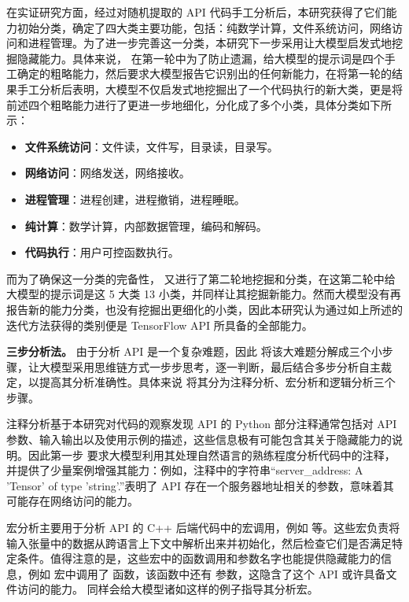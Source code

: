 在实证研究方面，经过对随机提取的 API 代码手工分析后，本研究获得了它们能力初始分类，确定了四大类主要功能，包括：纯数学计算，文件系统访问，网络访问和进程管理。为了进一步完善这一分类，本研究下一步采用让大模型启发式地挖掘隐藏能力。具体来说， 在第一轮中为了防止遗漏，给大模型的提示词是四个手工确定的粗略能力，然后要求大模型报告它识别出的任何新能力，在将第一轮的结果手工分析后表明，大模型不仅启发式地挖掘出了一个代码执行的新大类，更是将前述四个粗略能力进行了更进一步地细化，分化成了多个小类，具体分类如下所示：
\begin{itemize}
    \item \textbf{文件系统访问}：文件读，文件写，目录读，目录写。
    \item \textbf{网络访问}：网络发送，网络接收。
    \item \textbf{进程管理}：进程创建，进程撤销，进程睡眠。
    \item \textbf{纯计算}：数学计算，内部数据管理，编码和解码。
    \item \textbf{代码执行}：用户可控函数执行。
\end{itemize}

而为了确保这一分类的完备性， 又进行了第二轮地挖掘和分类，在这第二轮中给大模型的提示词是这 5 大类 13 小类，并同样让其挖掘新能力。然而大模型没有再报告新的能力分类，也没有挖掘出更细化的小类，因此本研究认为通过如上所述的迭代方法获得的类别便是 TensorFlow API 所具备的全部能力。

\textbf{三步分析法。}
由于分析 API 是一个复杂难题，因此  将该大难题分解成三个小步骤，让大模型采用思维链方式一步步思考，逐一判断，最后结合多步分析自主裁定，以提高其分析准确性。具体来说  将其分为注释分析、宏分析和逻辑分析三个步骤。

注释分析基于本研究对代码的观察发现 API 的 Python 部分注释通常包括对 API 参数、输入输出以及使用示例的描述，这些信息极有可能包含其关于隐藏能力的说明。因此第一步  要求大模型利用其处理自然语言的熟练程度分析代码中的注释，并提供了少量案例增强其能力：例如，注释中的字符串“server\_address: A 'Tensor' of type 'string'.”表明了 API 存在一个服务器地址相关的参数，意味着其可能存在网络访问的能力。

宏分析主要用于分析 API 的 C++ 后端代码中的宏调用，例如  等。这些宏负责将输入张量中的数据从跨语言上下文中解析出来并初始化，然后检查它们是否满足特定条件。值得注意的是，这些宏中的函数调用和参数名字也能提供隐藏能力的信息，例如  宏中调用了  函数，该函数中还有  参数，这隐含了这个 API 或许具备文件访问的能力。 同样会给大模型诸如这样的例子指导其分析宏。

